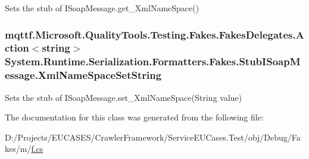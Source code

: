 Sets the stub of I\-Soap\-Message.\-get\-\_\-\-Xml\-Name\-Space()

\hypertarget{class_system_1_1_runtime_1_1_serialization_1_1_formatters_1_1_fakes_1_1_stub_i_soap_message_a7e0ea53e3f73a5e574f9a78a4709b856}{
\subsubsection[{Xml\-Name\-Space\-Set\-String}]{\setlength{\rightskip}{0pt plus 5cm}mqttf.\-Microsoft.\-Quality\-Tools.\-Testing.\-Fakes.\-Fakes\-Delegates.\-Action$<$string$>$ System.\-Runtime.\-Serialization.\-Formatters.\-Fakes.\-Stub\-I\-Soap\-Message.\-Xml\-Name\-Space\-Set\-String}}\label{class_system_1_1_runtime_1_1_serialization_1_1_formatters_1_1_fakes_1_1_stub_i_soap_message_a7e0ea53e3f73a5e574f9a78a4709b856}


Sets the stub of I\-Soap\-Message.\-set\-\_\-\-Xml\-Name\-Space(\-String value)



The documentation for this class was generated from the following file\-:\begin{DoxyCompactItemize}
\item 
D\-:/\-Projects/\-E\-U\-C\-A\-S\-E\-S/\-Crawler\-Framework/\-Service\-E\-U\-Cases.\-Test/obj/\-Debug/\-Fakes/m/\hyperlink{m_2f_8cs}{f.\-cs}\end{DoxyCompactItemize}
